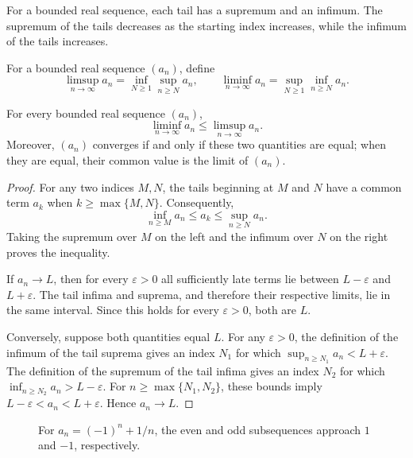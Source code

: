 For a bounded real sequence, each tail has a supremum and an infimum. The supremum of the tails decreases as the starting index increases, while the infimum of the tails increases.

\begin{definition}
For a bounded real sequence $(a_n)$, define
\[
 \limsup_{n\to\infty}a_n=\inf_{N\geq1}\sup_{n\geq N}a_n,
 \qquad
 \liminf_{n\to\infty}a_n=\sup_{N\geq1}\inf_{n\geq N}a_n.
\]
\end{definition}

\begin{theorem}
For every bounded real sequence $(a_n)$,
\[
 \liminf_{n\to\infty}a_n\leq\limsup_{n\to\infty}a_n.
\]
Moreover, $(a_n)$ converges if and only if these two quantities are equal; when they are equal, their common value is the limit of $(a_n)$.
\end{theorem}

\begin{proof}
For any two indices $M,N$, the tails beginning at $M$ and $N$ have a common term $a_k$ when $k\geq\max\{M,N\}$. Consequently,
\[
 \inf_{n\geq M}a_n\leq a_k\leq\sup_{n\geq N}a_n.
\]
Taking the supremum over $M$ on the left and the infimum over $N$ on the right proves the inequality.

If $a_n\to L$, then for every $\varepsilon>0$ all sufficiently late terms lie between $L-\varepsilon$ and $L+\varepsilon$. The tail infima and suprema, and therefore their respective limits, lie in the same interval. Since this holds for every $\varepsilon>0$, both are $L$.

Conversely, suppose both quantities equal $L$. For any $\varepsilon>0$, the definition of the infimum of the tail suprema gives an index $N_1$ for which $\sup_{n\geq N_1}a_n<L+\varepsilon$. The definition of the supremum of the tail infima gives an index $N_2$ for which $\inf_{n\geq N_2}a_n>L-\varepsilon$. For $n\geq\max\{N_1,N_2\}$, these bounds imply $L-\varepsilon<a_n<L+\varepsilon$. Hence $a_n\to L$.
\end{proof}

\begin{figure}[htbp]
\centering
{}
\caption{For $a_n=(-1)^n+1/n$, the even and odd subsequences approach $1$ and $-1$, respectively.}
\label{fig:limsup-liminf}
\end{figure}

